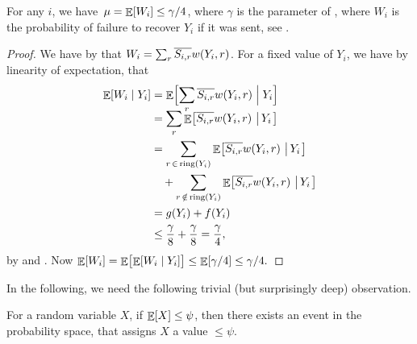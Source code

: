 \begin{lemma}
    For any $i$, we have $\,\mu = \mathop{\mathbb{E}}\!\left[ {W_i} \right] \leq \gamma/4$, where
    $\gamma$ is the parameter of , where $W_i$ is the
    probability of failure to recover $Y_i$ if it was sent, see
    .
\end{lemma}

\begin{proof}
    We have by  that
    $W_i= \sum_{r} \overline{S_{{i},{r}}} w(Y_i, r)$. For a fixed value of
    $Y_i$, we have by linearity of expectation, that
    \begin{align*}
      \ExCond{W_i}{Y_i}%
      &=%
        \ExCond{\Bigl. \smash{\sum_{r} \NotInS{i}{r} w(Y_i, r)}}{Y_i} \\
      &=%
        \sum_{r}
        \Ex{ \NotInS{i}{r} w(Y_i, r) \sep{Y_i}}
      \\
      & =%
        \sum_{r \,\in\, \sring{Y_i}} \Ex{ \NotInS{i}{r} w(Y_i, r)
        \sep{Y_i} } \\
      &\quad + \sum_{r \,\notin\, \sring{Y_i}} \Ex{
        \NotInS{i}{r} w(Y_i, r) \sep{Y_i}} \\
      &= g(Y_i) + f(Y_i) \\
      &\leq
        \frac{\gamma}{8} + \frac{\gamma}{8} = \frac{\gamma}{4},
    \end{align*} 
    by  and . Now
    \begin{math}
        \Ex{W_i}%
        =%
        \Ex{\bigl.\ExCond{W_i}{Y_i}}%
        \leq%
        \Ex{ \gamma/4 }%
        \leq%
        \gamma/4.
    \end{math}
\end{proof}

In the following, we need the following trivial (but surprisingly
deep) observation.

\begin{observation}%
    For a random variable $X$, if $\mathop{\mathbb{E}}\!\left[ {X} \right] \leq \psi$, then there
    exists an event in the probability space, that assigns $X$ a value
    $\leq \psi$.
\end{observation}


